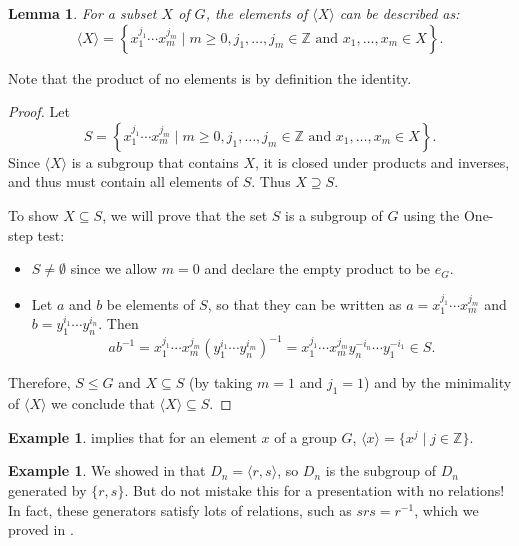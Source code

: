 \documentclass[12pt]{report}
\newtheorem{lemma}[theorem]{Lemma}
\numberwithin{equation}{section}
\numberwithin{theorem}{chapter}
\theoremstyle{definition}
\newtheorem{example}[theorem]{Example}
\newtheorem*{basic properties}{Basic Properties}
\newtheorem*{Important Remark}{Important Remark}
\begin{document}
\begin{lemma}\label{lem:<X>}
For a subset $X$ of $G$, the elements of $\langle X \rangle$ can be described as:
$$\langle X \rangle = \left\{x_1^{j_1} \cdots x_m^{j_m} \mid m \geqslant 0, j_1, \dots, j_m \in \mathbb{Z} \text{ and }x_1, \dots, x_m \in X \right\}.$$
\end{lemma}

Note that the product of no elements is by definition the identity.

\begin{proof} 
Let 
$$S= \left\{x_1^{j_1} \cdots x_m^{j_m} \mid m \geqslant 0, j_1, \dots, j_m \in \mathbb{Z} \text{ and }x_1, \dots, x_m \in X \right\}.$$ 
Since $\langle X \rangle$ is a subgroup that contains $X$, it is closed under products and inverses, and thus must contain all elements of $S$. Thus $X \supseteq S$.

To show $X \subseteq S$, we will prove that the set $S$ is a subgroup of $G$ using the One-step test:
\begin{itemize}
\item $S \neq \emptyset$ since we allow $m = 0$ and
declare the empty product to be $e_G$. 
\item Let $a$ and $b$ be elements of $S$, so that they can be written as
$a = x_1^{j_1} \cdots x_m^{j_m}$ and $b= y_1^{i_1} \cdots y_n^{i_n}$. Then
$$
ab^{-1} = x_1^{j_1} \cdots x_m^{j_m}(y_1^{i_1} \cdots y_n^{i_m})^{-1}=
x_1^{j_1} \cdots x_m^{j_m} y_n^{-i_n} \cdots y_1^{-i_1} \in S.
$$
\end{itemize}
Therefore, $S\leq G$ and $X\subseteq S$ (by taking $m=1$ and $j_1=1$) and by the minimality of $\langle X \rangle$ we conclude that $\langle X \rangle\subseteq S$. 
\end{proof}

 
 \begin{example} 
 implies that for an element $x$ of a group $G$, $\langle x\rangle=\{x^j \mid j\in \mathbb{Z}\}$.
\end{example}

\begin{example} 
We showed in  that $D_{n}=\langle r,s \rangle$, so $D_{n}$ is the subgroup of $D_{n}$ generated by $\{r,s\}$. But do not mistake this for a presentation with no relations! In fact, these generators satisfy lots of relations, such as $srs=r^{-1}$, which we proved in .
\end{example}
\end{document}
